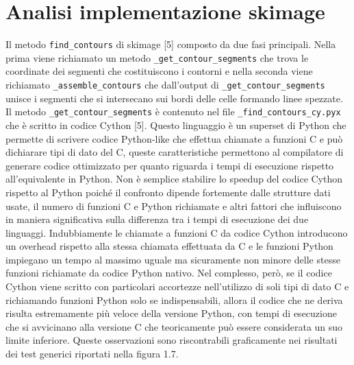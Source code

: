\documentclass[12pt,a4paper]{report}
\begin{document}
\section{Analisi implementazione skimage}
Il metodo \verb|find_contours| di skimage [5] composto da due fasi principali. Nella prima viene richiamato un metodo \verb|_get_contour_segments| che trova le coordinate dei segmenti che costituiscono i contorni e nella seconda viene richiamato \verb|_assemble_contours| che dall'output di \verb|_get_contour_segments| unisce i segmenti che si intersecano sui bordi delle celle formando linee spezzate. \newline
Il metodo \verb|_get_contour_segments| è contenuto nel file \verb|_find_contours_cy.pyx| che è scritto in codice Cython [5]. Questo linguaggio è un superset di Python che permette di scrivere codice Python-like che effettua chiamate a funzioni C e può dichiarare tipi di dato del C, queste caratteristiche permettono al compilatore di generare codice ottimizzato per quanto riguarda i tempi di esecuzione rispetto all'equivalente in Python. \newline
Non è semplice stabilire lo speedup del codice Cython rispetto al Python poiché il confronto dipende fortemente dalle strutture dati usate, il numero di funzioni C e Python richiamate e altri fattori che influiscono in maniera significativa sulla differenza tra i tempi di esecuzione dei due linguaggi. Indubbiamente le chiamate a funzioni C da codice Cython introducono un overhead rispetto alla stessa chiamata effettuata da C e le funzioni Python impiegano un tempo al massimo uguale ma sicuramente non minore delle stesse funzioni richiamate da codice Python nativo. \newline
Nel complesso, però, se il codice Cython viene scritto con particolari accortezze nell'utilizzo di soli tipi di dato C e richiamando funzioni Python solo se indispensabili, allora il codice che ne deriva risulta estremamente più veloce della versione Python, con tempi di esecuzione che si avvicinano alla versione C che teoricamente può essere considerata un suo limite inferiore. Queste osservazioni sono riscontrabili graficamente nei risultati dei test generici riportati nella figura 1.7. 
\end{document}
